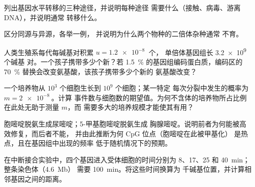 \begin{exercise}[$\star$]\label{exo:b2:genome-diversification:3}
列出基因水平转移的三种途径，并说明每种途径
需要什么（接触、病毒、游离 DNA），并说明通常
转移什么。
\end{exercise}

\begin{exercise}[$\star$]\label{exo:b2:genome-diversification:4}
区分同源与异源，各举一例，
并说明为什么两个物种的二倍体杂种通常
不育。
\end{exercise}

\begin{exercise}[$\star\star$]\label{exo:b2:genome-diversification:5}
人类生殖系每代每碱基对积累 $u = \qty{1.2e-8}{}$ 个，
单倍体基因组长 \qty{3.2e9}{} 个碱基
对。一个孩子携带多少个新？若 \qty{1.5}{\%}
的基因组编码蛋白质，编码区的 \qty{70}{\%}
替换会改变氨基酸，该孩子携带多少个新的
氨基酸改变？
\end{exercise}

\begin{exercise}[$\star\star$]\label{exo:b2:genome-diversification:6}
一个培养物从 $10^{3}$ 个细胞生长到 $10^{9}$ 个细胞；某一特定
每次分裂中发生的概率为 $m = \qty{2e-8}{}$。计算
事件数与细胞数的期望值。为何不含体的培养物所占比例
在此处无助于测量 $m$，而
需要多大的培养规模才能使其有用？
\end{exercise}

\begin{exercise}[$\star\star$]\label{exo:b2:genome-diversification:7}
胞嘧啶脱氨生成尿嘧啶；5-甲基胞嘧啶脱氨生成
胸腺嘧啶。说明前者为何能被高效修复，而后者不能，
并由此推断为何 CpG 位点（胞嘧啶在此被甲基化）
是热点，且在基因组中出现的频率
低于随机情况下的预期。
\end{exercise}

\begin{exercise}[$\star\star$]\label{exo:b2:genome-diversification:8}
在中断接合实验中，四个基因进入受体细胞的时间分别为
8、17、25 和 \qty{40}{min}；整条染色体（\qty{4.6}{Mb}）
需要 \qty{100}{min}。将这些时间换算为
千碱基位置，并计算相邻基因之间的距离。
\end{exercise}

